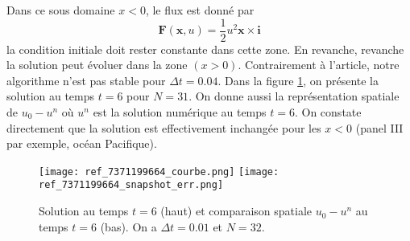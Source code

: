 \documentclass[10pt,a4paper]{article}
\begin{document}
Dans ce sous domaine $x<0$, le flux est donné par
\begin{equation}
\mathbf{F}(\mathbf{x},u) = \dfrac{1}{2} u^2 \mathbf{x} \times \mathbf{i} 
\end{equation}
la condition initiale doit rester constante dans cette zone. En revanche, revanche la solution peut évoluer dans la zone $(x>0)$. Contrairement à l'article, notre algorithme n'est pas stable pour $\Delta t = 0.04$. Dans la figure \ref{fig:test4}, on présente la solution au temps $t=6$ pour $N=31$. On donne aussi la représentation spatiale de $u_0 - u^n$ où $u^n$ est la solution numérique au temps $t=6$. On constate directement que la solution est effectivement inchangée pour les $x<0$ (panel III par exemple, océan Pacifique). 

\begin{figure}
\begin{center}
\texttt{[image: ref\_7371199664\_courbe.png]}
\texttt{[image: ref\_7371199664\_snapshot\_err.png]}
\caption{Solution au temps $t=6$ (haut) et comparaison spatiale $u_0-u^n$ au temps $t=6$ (bas). On a $\Delta t = 0.01$ et $N=32$.}
\end{center}
\label{fig:test4}
\end{figure}
\end{document}
